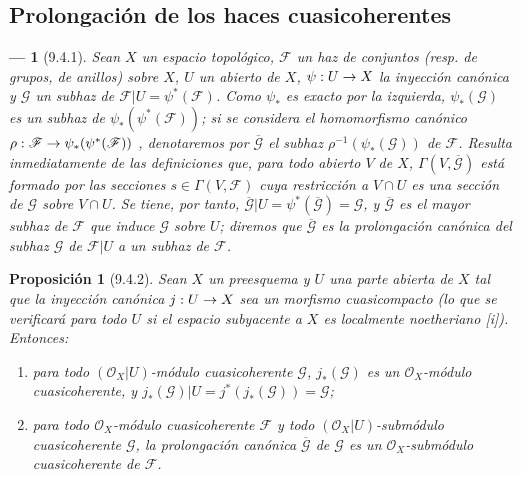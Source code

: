 \documentclass[oneside]{amsart}
\theoremstyle{ega-env-style}
\newtheorem*{env}{---}
\theoremstyle{ega-thm-env-style}
\newtheorem*{proposition}{Proposición}
\theoremstyle{ega-defn-env-style}
\renewcommand{\to}{\mathchoice{\longrightarrow}{\rightarrow}{\rightarrow}{\rightarrow}}
\newcommand{\oldpage}[2][]{{\marginnote{\normalfont{\textbf{#1}~|~#2}}}\ignorespaces}
\let\EGAOriginalLabel\label
\renewcommand{\label}[1]{\phantomsection\EGAOriginalLabel{#1}}
\begin{document}
\oldpage[I]{174}
\subsection{Prolongación de los haces cuasicoherentes}
\label{subsection:I.9.4}

\begin{env}[9.4.1]
\label{I.9.4.1}
Sean $X$ un espacio topológico, $\mathscr{F}$ un haz de conjuntos (resp. de grupos, de anillos)
sobre $X$, $U$ un abierto de $X$, $\psi:U\to X$ la inyección canónica y $\mathscr{G}$ un subhaz
de $\mathscr{F}|U=\psi^*(\mathscr{F})$. Como $\psi_*$ es exacto por la izquierda, $\psi_*(\mathscr{G})$
es un subhaz de $\psi_*(\psi^*(\mathscr{F}))$; si se considera el homomorfismo canónico $\rho:\mathscr{F}\to\psi_*(\psi^*(\mathscr{F}))$ , denotaremos por $\overline{\mathscr{G}}$ el subhaz
$\rho^{-1}(\psi_*(\mathscr{G}))$ de $\mathscr{F}$. Resulta
inmediatamente de las definiciones que, para todo abierto $V$ de $X$,
$\Gamma(V,\overline{\mathscr{G}})$ está formado por las secciones $s\in\Gamma(V,\mathscr{F})$ cuya
restricción a $V\cap U$ es una sección de $\mathscr{G}$ sobre $V\cap U$. Se tiene, por tanto,
$\overline{\mathscr{G}}|U=\psi^*(\overline{\mathscr{G}})=\mathscr{G}$, y $\overline{\mathscr{G}}$ es el
\emph{mayor} subhaz de $\mathscr{F}$ que induce $\mathscr{G}$ sobre $U$; diremos que
$\overline{\mathscr{G}}$ es la \emph{prolongación canónica} del subhaz $\mathscr{G}$ de $\mathscr{F}|U$
a un subhaz de $\mathscr{F}$.
\end{env}

\begin{proposition}[9.4.2]
\label{I.9.4.2}
Sean $X$ un preesquema y $U$ una parte abierta de $X$ tal que la inyección canónica
$j:U\to X$ sea un morfismo cuasicompacto \emph{(lo que se verificará para \emph{todo} $U$ si
el espacio subyacente a $X$ es \emph{localmente noetheriano}
[i])}. Entonces:
\begin{enumerate}
  \item[{\rm(i)}] para todo $(\mathscr{O}_X|U)$-módulo cuasicoherente $\mathscr{G}$, $j_*(\mathscr{G})$
    es un $\mathscr{O}_X$-módulo cuasicoherente, y
    $j_*(\mathscr{G})|U=j^*(j_*(\mathscr{G}))=\mathscr{G}$;
  \item[{\rm(ii)}] para todo $\mathscr{O}_X$-módulo cuasicoherente $\mathscr{F}$ y todo
    $(\mathscr{O}_X|U)$-submódulo cuasicoherente $\mathscr{G}$, la prolongación canónica
    $\overline{\mathscr{G}}$ de $\mathscr{G}$  es un
    $\mathscr{O}_X$-submódulo cuasicoherente de $\mathscr{F}$.
\end{enumerate}
\end{proposition}
\end{document}
